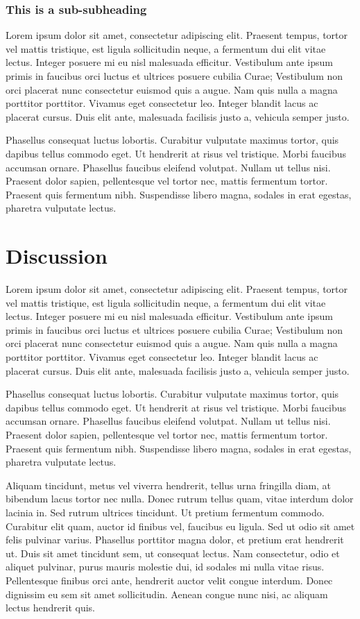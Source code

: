 \documentclass[paper=a4,fontsize=11pt,twocolumn]{article}
\begin{document}
\subsubsection{This is a sub-subheading}
Lorem ipsum dolor sit amet, consectetur adipiscing elit. Praesent tempus, tortor vel mattis tristique, est ligula sollicitudin neque, a fermentum dui elit vitae lectus. Integer posuere mi eu nisl malesuada efficitur. Vestibulum ante ipsum primis in faucibus orci luctus et ultrices posuere cubilia Curae; Vestibulum non orci placerat nunc consectetur euismod quis a augue. Nam quis nulla a magna porttitor porttitor. Vivamus eget consectetur leo. Integer blandit lacus ac placerat cursus. Duis elit ante, malesuada facilisis justo a, vehicula semper justo.

Phasellus consequat luctus lobortis. Curabitur vulputate maximus tortor, quis dapibus tellus commodo eget. Ut hendrerit at risus vel tristique. Morbi faucibus accumsan ornare. Phasellus faucibus eleifend volutpat. Nullam ut tellus nisi. Praesent dolor sapien, pellentesque vel tortor nec, mattis fermentum tortor. Praesent quis fermentum nibh. Suspendisse libero magna, sodales in erat egestas, pharetra vulputate lectus.


\section{Discussion}
Lorem ipsum dolor sit amet, consectetur adipiscing elit. Praesent tempus, tortor vel mattis tristique, est ligula sollicitudin neque, a fermentum dui elit vitae lectus. Integer posuere mi eu nisl malesuada efficitur. Vestibulum ante ipsum primis in faucibus orci luctus et ultrices posuere cubilia Curae; Vestibulum non orci placerat nunc consectetur euismod quis a augue. Nam quis nulla a magna porttitor porttitor. Vivamus eget consectetur leo. Integer blandit lacus ac placerat cursus. Duis elit ante, malesuada facilisis justo a, vehicula semper justo.

Phasellus consequat luctus lobortis. Curabitur vulputate maximus tortor, quis dapibus tellus commodo eget. Ut hendrerit at risus vel tristique. Morbi faucibus accumsan ornare. Phasellus faucibus eleifend volutpat. Nullam ut tellus nisi. Praesent dolor sapien, pellentesque vel tortor nec, mattis fermentum tortor. Praesent quis fermentum nibh. Suspendisse libero magna, sodales in erat egestas, pharetra vulputate lectus.

Aliquam tincidunt, metus vel viverra hendrerit, tellus urna fringilla diam, at bibendum lacus tortor nec nulla. Donec rutrum tellus quam, vitae interdum dolor lacinia in. Sed rutrum ultrices tincidunt. Ut pretium fermentum commodo. Curabitur elit quam, auctor id finibus vel, faucibus eu ligula. Sed ut odio sit amet felis pulvinar varius. Phasellus porttitor magna dolor, et pretium erat hendrerit ut. Duis sit amet tincidunt sem, ut consequat lectus. Nam consectetur, odio et aliquet pulvinar, purus mauris molestie dui, id sodales mi nulla vitae risus. Pellentesque finibus orci ante, hendrerit auctor velit congue interdum. Donec dignissim eu sem sit amet sollicitudin. Aenean congue nunc nisi, ac aliquam lectus hendrerit quis.
\end{document}
